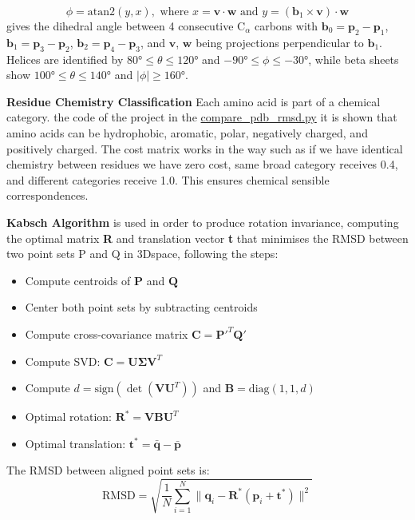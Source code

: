 \documentclass[\reportLanguage, twocolumn, 11pt]{article}
\begin{document}
$$\phi = \text{atan2}(y, x), \text{ where } x = \mathbf{v} \cdot \mathbf{w} \text{ and } y = (\mathbf{b}_1 \times \mathbf{v}) \cdot \mathbf{w}$$
gives the dihedral angle between 4 consecutive C$_\alpha$ carbons with $\mathbf{b}_0 = \mathbf{p}_2 - \mathbf{p}_1$, $\mathbf{b}_1 = \mathbf{p}_3 - \mathbf{p}_2$, $\mathbf{b}_2 = \mathbf{p}_4 - \mathbf{p}_3$, and $\mathbf{v}$, $\mathbf{w}$ being projections perpendicular to $\mathbf{b}_1$. Helices are identified by $80° \leq \theta \leq 120°$ and $-90° \leq \phi \leq -30°$, while beta sheets show $100° \leq \theta \leq 140°$ and $|\phi| \geq 160°$\cite{delacruz1997discrete,flocco1995c,keskin1998packing,grassein2020curvature,wikipedia2025dihedral,korkut2009force}.

\textbf{Residue Chemistry Classification} Each amino acid is part of a chemical category. \cite{shehaj2025} the code of the project in the \url{compare_pdb_rmsd.py} it is shown that amino acids can be hydrophobic, aromatic, polar, negatively charged, and positively charged\cite{taylor1986}. The cost matrix works in the way such as if we have identical chemistry between residues we have zero cost, same broad category receives 0.4, and different categories receive 1.0. This ensures chemical sensible correspondences.  

\textbf{Kabsch Algorithm} is used in order to produce rotation invariance, computing the optimal matrix \textbf{R} and translation vector \textbf{t} that minimises the RMSD between two point sets P and Q in 3Dspace, following the steps\cite{kabsch}:
\begin{itemize}
    \item Compute centroids of $\mathbf{P}$ and $\mathbf{Q}$
    \item Center both point sets by subtracting centroids
    \item Compute cross-covariance matrix $\mathbf{C} = \mathbf{P}'^T \mathbf{Q}'$
    \item Compute SVD: $\mathbf{C} = \mathbf{U} \mathbf{\Sigma} \mathbf{V}^T$
    \item Compute $d = \text{sign}(\det(\mathbf{V} \mathbf{U}^T))$ and $\mathbf{B} = \text{diag}(1, 1, d)$
    \item Optimal rotation: $\mathbf{R}^* = \mathbf{V} \mathbf{B} \mathbf{U}^T$
    \item Optimal translation: $\mathbf{t}^* = \bar{\mathbf{q}} - \bar{\mathbf{p}}$
\end{itemize}

The RMSD between aligned point sets is\cite{kabsch}:
$$\text{RMSD} = \sqrt{\frac{1}{N} \sum_{i=1}^{N} \|\mathbf{q}_i - \mathbf{R}^*(\mathbf{p}_i + \mathbf{t}^*)\|^2}$$
\end{document}
